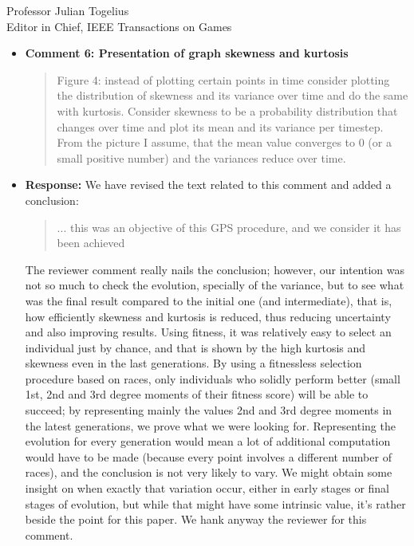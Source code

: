 \documentclass[10pt]{letter} %
\begin{document}
\begin{letter}{Professor Julian Togelius \\ Editor in Chief, IEEE Transactions on Games}
\begin{enumerate}
\begin{itemize}
\item {\bf Comment 6: Presentation of graph skewness and kurtosis
\begin{quote}
			Figure 4: instead of plotting certain points in time consider plotting
			the distribution of skewness and its variance over time and do the same 
			with kurtosis. Consider skewness to be a probability distribution that 
			changes over time and plot its mean and its variance per timestep.
			From the picture I assume, that the mean value converges to 0 (or a 
			small positive number) and the variances reduce over time.
		\end{quote}
		}
              \item {\bf Response:} We have revised the text related to this comment and added a conclusion:
                \begin{quote}
                  ... this was an objective of this GPS procedure, and we consider it has been achieved
                \end{quote}

 The reviewer comment really nails the conclusion; however, our
 intention was not so much to check the evolution, specially of the
 variance, but to see what was the final result compared to the
 initial one (and intermediate), that is, how efficiently skewness and
 kurtosis is reduced, thus reducing uncertainty and also improving
 results. Using fitness, it was relatively easy to select an
 individual just by chance, and that is shown by the high kurtosis and
 skewness even in the last generations. By using a fitnessless
 selection procedure based on races, only individuals who solidly
 perform better (small 1st, 2nd and 3rd degree moments of their
 fitness score) will be able to succeed; by representing mainly the
 values 2nd and 3rd degree moments in the latest generations, we prove
 what we were looking for. Representing the evolution for every
 generation would mean a lot of additional computation would have to
 be made (because every point involves a different number of races),
 and the conclusion is not very likely to vary. We might obtain some
 insight on when exactly that variation occur, either in early stages
 or final stages of evolution, but while that might have some
 intrinsic value, it's rather beside the point for this paper. We hank
 anyway the reviewer for this comment.
   \end{itemize}

\newpage



\end{enumerate}
\end{letter}
\end{document}
